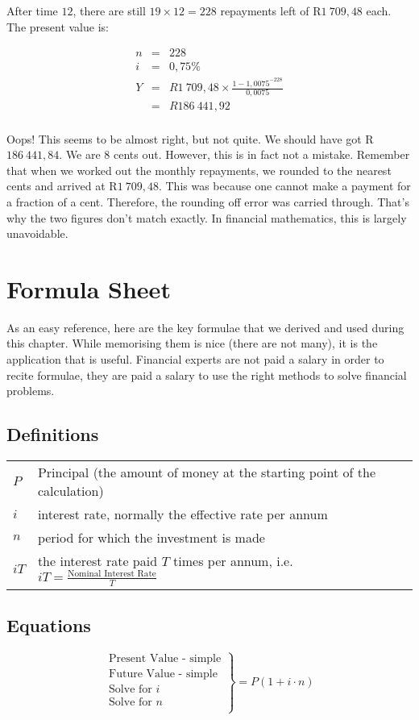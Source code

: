 After time $12$, there are still $19 \times 12 = 228$ repayments left of R$1~709,48$ each. The present value is:

\begin{eqnarray*}
n &=& 228\\
i &=& 0,75\%\\
Y &=&R1~709,48 \times \frac{1-1,0075^{-228}}{0,0075}\\
&=& R186~441,92\\
\end{eqnarray*}

Oops! This seems to be almost right, but not quite. We should have got R$186~441,84$. We are $8$ cents out. However, this is in fact not a mistake. Remember that when we worked out the monthly repayments, we rounded to the nearest cents and arrived at R$1~709,48$. This was because one cannot make a payment for a fraction of a cent. Therefore, the rounding off error was carried through. That's why the two figures don't match exactly. In financial mathematics, this is largely unavoidable.


\section{Formula Sheet}
As an easy reference, here are the key formulae that we derived and used during this chapter. While memorising them is nice (there are not many), it is the application that is useful. Financial experts are not paid a salary in order to recite formulae, they are paid a salary to use the right methods to solve financial problems.

\subsection{Definitions}
\begin{tabular}{ll}
$P$ &Principal (the amount of money at the starting point of the calculation)\\
$i$ &interest rate, normally the effective rate per annum\\
$n$ &period for which the investment is made\\
$iT$ &the interest rate paid $T$ times per annum, i.e. $iT = \frac{\mbox{Nominal Interest Rate}}{T}$
\end{tabular}

\subsection{Equations}
\begin{equation*}
\left.\begin{array}{l}
\mbox{Present Value - simple}\\
\mbox{Future Value - simple} \\
\mbox{Solve for $i$}\\
\mbox{Solve for $n$}\\
\end{array}\right\}= P (1 + i \cdot n)
\end{equation*}

